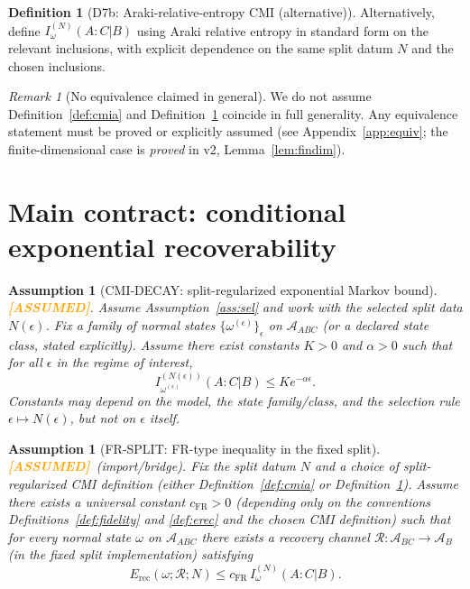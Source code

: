 \documentclass[11pt]{article}
\newtheorem{assumption}[theorem]{Assumption}
\theoremstyle{definition}
\newtheorem{definition}[theorem]{Definition}
\theoremstyle{remark}
\newtheorem{remark}[theorem]{Remark}
\newcommand{\ASSUMED}{\textcolor{orange}{\textbf{[ASSUMED]}}}
\newcommand{\Erec}{E_{\mathrm{rec}}}
\newcommand{\cA}{\mathcal{A}}
\newcommand{\cR}{\mathcal{R}}
\begin{document}
\begin{definition}[D7b: Araki-relative-entropy CMI (alternative)]
\label{def:cmib}
Alternatively, define $I^{(N)}_\omega(A : C | B)$ using Araki relative
entropy in standard form on the relevant inclusions, with explicit
dependence on the same split datum $N$ and the chosen inclusions.
\end{definition}

\begin{remark}[No equivalence claimed in general]
\label{rem:noequiv}
We do not assume Definition~\ref{def:cmia} and Definition~\ref{def:cmib}
coincide in full generality. Any equivalence statement must be proved or
explicitly assumed (see Appendix~\ref{app:equiv}; the finite-dimensional
case is \emph{proved} in v2, Lemma~\ref{lem:findim}).
\end{remark}

\section{Main contract: conditional exponential recoverability}

\begin{assumption}[CMI-DECAY: split-regularized exponential Markov
bound]
\label{ass:cmidecay}
\ASSUMED. Assume Assumption~\ref{ass:sel} and work with the selected
split data $N(\epsilon)$. Fix a family of normal states
$\{\omega^{(\epsilon)}\}_\epsilon$ on $\cA_{ABC}$ (or a declared state
class, stated explicitly). Assume there exist constants $K > 0$ and
$\alpha > 0$ such that for all $\epsilon$ in the regime of interest,
\[
I^{(N(\epsilon))}_{\omega^{(\epsilon)}}(A : C | B) \le K e^{-\alpha
\epsilon}.
\]
Constants may depend on the model, the state family/class, and the
selection rule $\epsilon \mapsto N(\epsilon)$, but not on $\epsilon$
itself.
\end{assumption}

\begin{assumption}[FR-SPLIT: FR-type inequality in the fixed split]
\label{ass:frsplit}
\ASSUMED\ (import/bridge). Fix the split datum $N$ and a choice of
split-regularized CMI definition (either Definition~\ref{def:cmia} or
Definition~\ref{def:cmib}). Assume there exists a universal constant
$c_{\mathrm{FR}} > 0$ (depending only on the conventions
Definitions~\ref{def:fidelity} and \ref{def:erec} and the chosen CMI
definition) such that for every normal state $\omega$ on $\cA_{ABC}$
there exists a recovery channel $\cR: \cA_{BC} \to \cA_B$ (in the fixed
split implementation) satisfying
\[
\Erec(\omega; \cR; N) \le c_{\mathrm{FR}}\, I^{(N)}_\omega(A : C | B).
\]
\end{assumption}
\end{document}

